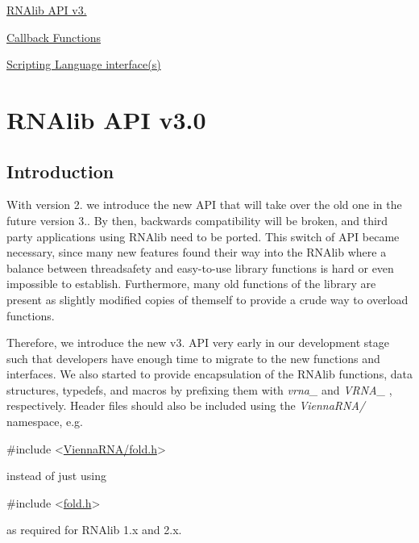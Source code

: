 
\begin{DoxyItemize}
\item \hyperlink{newAPI}{R\+N\+Alib A\+PI v3.}
\item \hyperlink{callbacks}{Callback Functions}
\item \hyperlink{wrappers}{Scripting Language interface(s)} 
\end{DoxyItemize}\hypertarget{newAPI}{}\section{R\+N\+Alib A\+PI v3.0}\label{newAPI}
\hypertarget{newAPI_newAPI_intro}{}\subsection{Introduction}\label{newAPI_newAPI_intro}
With version 2. we introduce the new A\+PI that will take over the old one in the future version 3.. By then, backwards compatibility will be broken, and third party applications using R\+N\+Alib need to be ported. This switch of A\+PI became necessary, since many new features found their way into the R\+N\+Alib where a balance between threadsafety and easy-\/to-\/use library functions is hard or even impossible to establish. Furthermore, many old functions of the library are present as slightly modified copies of themself to provide a crude way to overload functions.

Therefore, we introduce the new v3. A\+PI very early in our development stage such that developers have enough time to migrate to the new functions and interfaces. We also started to provide encapsulation of the R\+N\+Alib functions, data structures, typedefs, and macros by prefixing them with {\itshape vrna\+\_\+} and {\itshape V\+R\+N\+A\+\_\+} , respectively. Header files should also be included using the {\itshape Vienna\+R\+N\+A/} namespace, e.\+g. 
\begin{DoxyCode}
\textcolor{preprocessor}{#include <\hyperlink{fold_8h}{ViennaRNA/fold.h}>}
\end{DoxyCode}
 instead of just using 
\begin{DoxyCode}
\textcolor{preprocessor}{#include <\hyperlink{fold_8h}{fold.h}>}
\end{DoxyCode}
 as required for R\+N\+Alib 1.\+x and 2.\+x.

